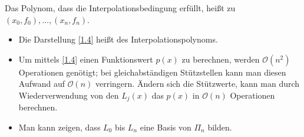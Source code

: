 \begin{*definition}[Interpolationspolynom]
	Das Polynom, dass die Interpolationsbedingung erfüllt, heißt  zu $(x_0,f_0),\dots,(x_n,f_n)$.
\end{*definition}

\begin{remark}
	\begin{itemize}
		\item Die Darstellung \cref{1.4} heißt  des Interpolationspolynoms.
		\item Um mittels \cref{1.4} einen Funktionswert $p(x)$ zu berechnen, werden $\mathcal{O}(n^2)$ Operationen genötigt; bei gleichabständigen Stützstellen kann man diesen Aufwand auf $\mathcal{O}(n)$ verringern. Ändern sich die Stützwerte, kann man durch Wiederverwendung von den $L_j(x)$ das $p(x)$ in $\mathcal{O}(n)$ Operationen berechnen.
		\item Man kann zeigen, dass $L_0$ bis $L_n$ eine Basis von $\Pi_n$ bilden.
	\end{itemize}
\end{remark}
